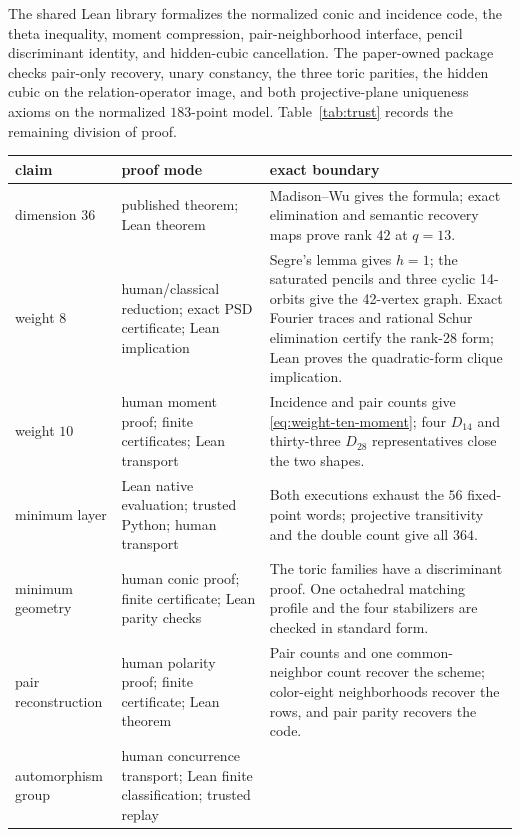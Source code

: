 \documentclass[11pt]{article}
\theoremstyle{definition}
\theoremstyle{remark}
\begin{document}
The shared Lean library formalizes the normalized conic and incidence code,
the theta inequality, moment compression, pair-neighborhood interface,
pencil discriminant identity, and hidden-cubic cancellation.  The
paper-owned package checks pair-only recovery, unary constancy, the three
toric parities, the hidden cubic on the relation-operator image, and both
projective-plane uniqueness axioms on the normalized \(183\)-point model.
Table~\ref{tab:trust} records the remaining division of proof.

\clearpage
\begin{table}[!ht]
\centering
\footnotesize
\begin{tabular}{@{}>{\raggedright\arraybackslash}p{}
  >{\raggedright\arraybackslash}p{}
  >{\raggedright\arraybackslash}p{}@{}}
\toprule
claim & proof mode & exact boundary\\
\midrule
dimension \(36\)
& published theorem; Lean theorem
& Madison--Wu gives the formula; exact elimination and semantic recovery maps
  prove rank \(42\) at \(q=13\).\\
weight \(8\)
& human/classical reduction; exact PSD certificate; Lean implication
& Segre's lemma gives \(h=1\); the saturated pencils and three cyclic
  14-orbits give the 42-vertex graph.  Exact Fourier traces and rational
  Schur elimination certify the rank-28 form; Lean proves the quadratic-form
  clique implication.\\
weight \(10\)
& human moment proof; finite certificates; Lean transport
& Incidence and pair counts give \eqref{eq:weight-ten-moment}; four
  \(D_{14}\) and thirty-three \(D_{28}\) representatives close the two
  shapes.\\
minimum layer
& Lean native evaluation; trusted Python; human transport
& Both executions exhaust the \(56\) fixed-point words; projective
  transitivity and the double count give all \(364\).\\
minimum geometry
& human conic proof; finite certificate; Lean parity checks
& The toric families have a discriminant proof.  One octahedral matching
  profile and the four stabilizers are checked in standard form.\\
pair reconstruction
& human polarity proof; finite certificate; Lean theorem
& Pair counts and one common-neighbor count recover the scheme; color-eight
  neighborhoods recover the rows, and pair parity recovers the code.\\
automorphism group
& human concurrence transport; Lean finite classification; trusted replay

\end{tabular}
\end{table}
\end{document}
